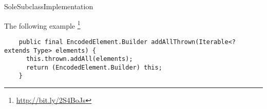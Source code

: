 \begin{pattern}{SoleSubclassImplementation}

\instances{}
The following example%
\footnote{\url{http://bit.ly/2S4BoJs}}

\begin{verbatim}
    public final EncodedElement.Builder addAllThrown(Iterable<? extends Type> elements) {
      this.thrown.addAll(elements);
      return (EncodedElement.Builder) this;
    }
\end{verbatim}

\detection{}

\discussion{}

\related{}

\end{pattern}